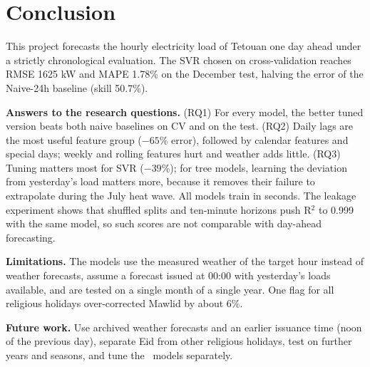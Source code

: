 \section{Conclusion}\label{sec:conclusion}
This project forecasts the hourly electricity load of Tetouan one day ahead under a strictly chronological evaluation. The SVR chosen on cross-validation reaches RMSE \num{1625} kW and MAPE 1.78\% on the December test, halving the error of the Naive-24h baseline (skill 50.7\%).

\textbf{Answers to the research questions.} (RQ1) For every model, the better tuned version beats both naive baselines on CV and on the test. (RQ2) Daily lags are the most useful feature group ($-65$\% error), followed by calendar features and special days; weekly and rolling features hurt and weather adds little. (RQ3) Tuning matters most for SVR ($-39$\%); for tree models, learning the deviation from yesterday's load matters more, because it removes their failure to extrapolate during the July heat wave. All models train in seconds. The leakage experiment shows that shuffled splits and ten-minute horizons push R$^2$ to 0.999 with the same model, so such scores are not comparable with day-ahead forecasting.

\textbf{Limitations.} The models use the measured weather of the target hour instead of weather forecasts, assume a forecast issued at 00:00 with yesterday's loads available, and are tested on a single month of a single year. One flag for all religious holidays over-corrected Mawlid by about 6\%.

\textbf{Future work.} Use archived weather forecasts and an earlier issuance time (noon of the previous day), separate Eid from other religious holidays, test on further years and seasons, and tune the \hone\ models separately.
